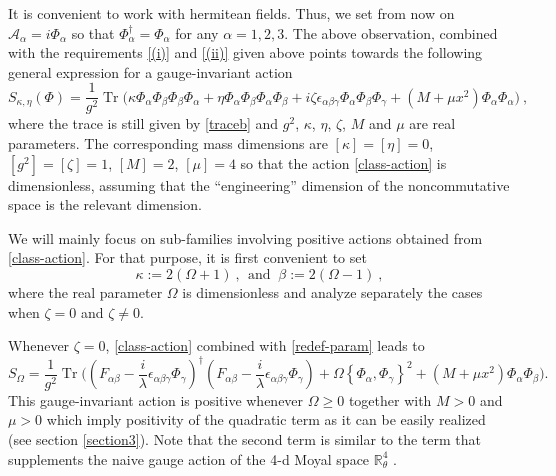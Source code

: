 \documentclass[a4paper,11pt,twoside]{article}
\numberwithin{equation}{section}
\DeclareMathOperator{\tr}{Tr}
\theoremstyle{nonumberplain}
\newcounter{and}
\begin{document}
%
It is convenient to work with hermitean fields. Thus, we set from now on $\mathcal{A}_\alpha = i \Phi_\alpha$ so that $\Phi^\dag_\alpha = \Phi_\alpha$ for any $\alpha=1,2,3$. The above observation, combined with the requirements \ref{(i)} and \ref{(ii)} given above points towards the following general expression for a gauge-invariant action%
%
\begin{equation}
S_{\kappa,\eta}(\Phi) = \frac{1}{g^2} \tr\bigg( \kappa \Phi_\alpha \Phi_\beta \Phi_\beta \Phi_\alpha + \eta \Phi_\alpha \Phi_\beta \Phi_\alpha \Phi_\beta + i \zeta \epsilon_{\alpha\beta\gamma} \Phi_\alpha \Phi_\beta \Phi_\gamma + \left(M+\mu x^2\right) \Phi_\alpha \Phi_\alpha \bigg) \ , \label{class-action}
\end{equation}
%
where the trace is still given by \eqref{traceb} and $g^2$, $\kappa$, $\eta$, $\zeta$, $M$ and $\mu$ are real parameters. The corresponding mass dimensions are $[\kappa]=[\eta]=0$, $[g^2]=[\zeta]=1$, $[M]=2$, $[\mu]=4$ so that the action \eqref{class-action} is dimensionless, assuming that the ``engineering'' dimension of the noncommutative space is the relevant dimension.\par%
%
We will mainly focus on sub-families involving positive actions obtained from \eqref{class-action}. For that purpose, it is first convenient to set%
%
\begin{equation}
\kappa := 2(\Omega+1) \ , \ \ \mbox{and } \ \beta := 2(\Omega-1) \ , \label{redef-param}
\end{equation}
%
where the real parameter $\Omega$ is dimensionless and analyze separately the cases when $\zeta=0$ and $\zeta\ne0$.\par%
%
Whenever $\zeta=0$, \eqref{class-action} combined with \eqref{redef-param} leads to%
%
\begin{equation}
S_\Omega = \frac{1}{g^2} \tr\bigg(\left(F_{\alpha\beta} - \frac{i}{\lambda} \epsilon_{\alpha\beta\gamma} \Phi_\gamma\right)^\dag \left(F_{\alpha\beta} - \frac{i}{\lambda} \epsilon_{\alpha\beta\gamma} \Phi_\gamma\right) + \Omega\left\{\Phi_\alpha,\Phi_\gamma\right\}^2 + \left(M+\mu x^2\right) \Phi_\alpha \Phi_\beta \bigg) \label{zeta=0}.
\end{equation}
%
This gauge-invariant action is positive whenever $\Omega\ge0$ together with $M>0$ and $\mu>0$ which imply positivity of the quadratic term as it can be easily realized (see section \ref{section3}). Note that the second term is similar to the term that supplements the naive gauge action of the 4-d Moyal space $\mathbb{R}^4_\theta$ \cite{GWW, GW07}.\par%
\end{document}
